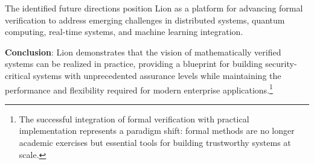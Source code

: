 The identified future directions position Lion as a platform for advancing formal verification to address emerging challenges in distributed systems, quantum computing, real-time systems, and machine learning integration.

\textbf{Conclusion}: Lion demonstrates that the vision of mathematically verified systems can be realized in practice, providing a blueprint for building security-critical systems with unprecedented assurance levels while maintaining the performance and flexibility required for modern enterprise applications.\footnote{The successful integration of formal verification with practical implementation represents a paradigm shift: formal methods are no longer academic exercises but essential tools for building trustworthy systems at scale.}

\newpage


